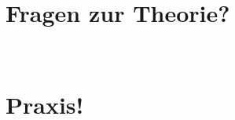 \documentclass[c]{beamer}
\begin{document}
\section{Fragen zur Theorie?}
\begin{frame}
  \begin{center}
     \\
  \end{center}
\end{frame}

%
\section{Praxis!}
\begin{frame}
  \begin{center}
     \\
  \end{center}
\end{frame}
\end{document}

